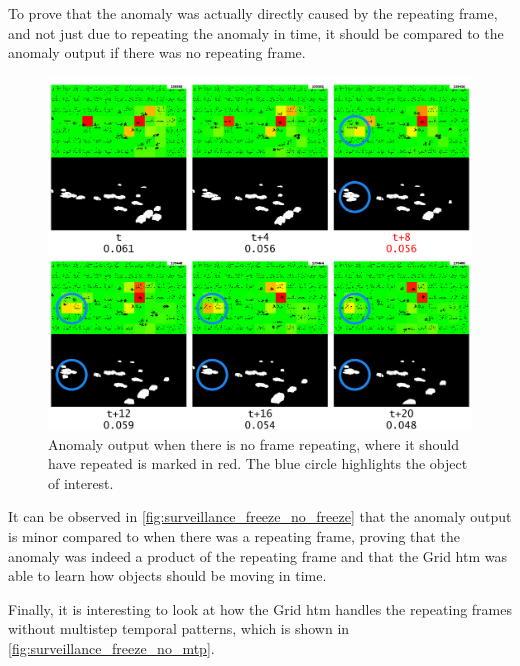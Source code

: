 \par
To prove that the anomaly was actually directly caused by the repeating frame, and not just due to repeating the anomaly in time, it should be compared to the anomaly output if there was no repeating frame.
\begin{figure}[H]
    \centering
    \includegraphics[width=\textwidth]{resources/experiments/surveillance/surveillance_freeze_no_freeze.png}
    \caption[No Frame Repeat Anomaly]{Anomaly output when there is no frame repeating, where it should have repeated is marked in red. The blue circle highlights the object of interest.}
    \label{fig:surveillance_freeze_no_freeze}
\end{figure}
It can be observed in \autoref{fig:surveillance_freeze_no_freeze} that the anomaly output is minor compared to when there was a repeating frame, proving that the anomaly was indeed a product of the repeating frame and that the Grid \gls*{htm} was able to learn how objects should be moving in time.
\par
Finally, it is interesting to look at how the Grid \gls*{htm} handles the repeating frames without multistep temporal patterns, which is shown in \autoref{fig:surveillance_freeze_no_mtp}.
